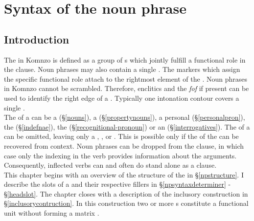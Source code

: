 
\chapter{Syntax of the noun phrase}\label{cha:npsyntax}

\section{Introduction}\label{npsyntax}

The  in Komnzo is defined as a group of s which jointly fulfill a functional role in the clause. Noun phrases may also contain a single . The  markers which assign the specific functional role attach to the rightmost element of the . Noun phrases in Komnzo cannot be scrambled. Therefore,  enclitics and the   \emph{fof} \textendash{} if present \textendash{} can be used to identify the right edge of a . Typically one intonation contour covers a single .\\

The  of a  can be a  (\S{}\ref{nouns}), a  (\S{}\ref{propertynouns}), a personal  (\S{}\ref{personalpron}), the   (\S{}\ref{indefnae}), the   (\S{}\ref{recognitional-pronoun}) or an  (\S{}\ref{interrogatives}). The  of a  can be omitted, leaving only a , ,  or . This is possible only if the  of the  can be recovered from context. Noun phrases can be dropped from the clause, in which case only the indexing in the verb provides information about the arguments. Consequently, inflected verbs can and often do stand alone as a clause.\\

This chapter begins with an overview of the structure of the  in \S{}\ref{npstructure}. I describe the slots of a  and their respective fillers in \S{}\ref{npsyntaxdeterminer} - \S{}\ref{headslot}. The chapter closes with a description of the inclusory construction in \S{}\ref{inclusorycontruction}. In this construction two or more s constitute a functional unit without forming a matrix .


